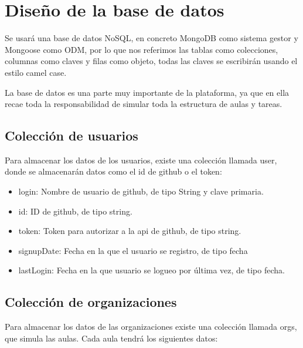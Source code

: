 
\section{Diseño de la base de datos}
\label{:sec4}

Se usará una base de datos NoSQL, en concreto MongoDB como sistema gestor y Mongoose como ODM, por lo que nos referimos las tablas como colecciones, columnas como claves y filas como objeto, todas las claves se escribirán usando el estilo camel case.

La base de datos es una parte muy importante de la plataforma, ya que en ella recae toda la responsabilidad de simular toda la estructura de aulas y tareas.

\subsection{Colección de usuarios}
\label{3:4:1}

Para almacenar los datos de los usuarios, existe una colección llamada user, donde se almacenarán datos como el id de github o el token:

\begin{itemize}
  \item login: Nombre de usuario de github, de tipo String y clave primaria.
  \item id: ID de github, de tipo string.
  \item token: Token para autorizar a la api de github, de tipo string.
  \item signupDate: Fecha en la que el usuario se registro, de tipo fecha
  \item lastLogin: Fecha en la que usuario se logueo por última vez, de tipo fecha.
\end{itemize}

\subsection{Colección de organizaciones}
\label{3:4:2}

Para almacenar los datos de las organizaciones existe una colección llamada orgs, que simula las aulas. Cada aula tendrá los siguientes datos:

